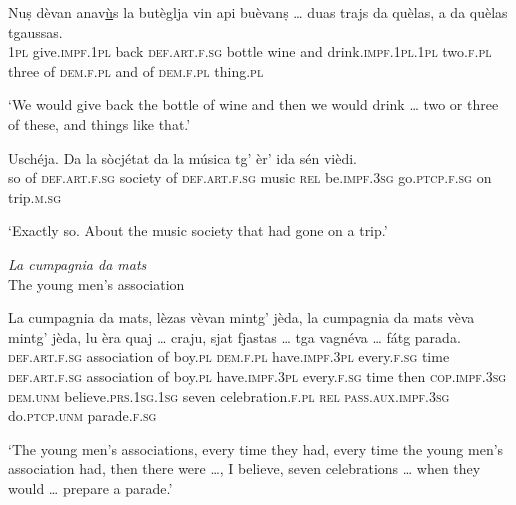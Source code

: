 \begin{linenumbers}
	\gll    Nuṣ dèvan anav\underline{ù}s la butèglja vin api buèvanṣ … duas trajs da quèlas, a da quèlas tgaussas.\\
	\textsc{1pl} give.\textsc{impf.1pl} back \textsc{def.art.f.sg} bottle wine and drink.\textsc{impf.1pl.1pl} {} two.\textsc{f.pl} three of \textsc{dem.f.pl} and of  \textsc{dem.f.pl} thing.\textsc{pl}\\
\end{linenumbers}
\medskip
\glt `We would give back the bottle of wine and then we would drink … two or three of these, and things like that.'
\medskip

\begin{linenumbers}
\gll    Uschéja. Da la sòcjétat da la música tg’ èr’ ida sén vièdi.\\
so of \textsc{def.art.f.sg} society of \textsc{def.art.f.sg} music \textsc{rel} be.\textsc{impf.3sg} go.\textsc{ptcp.f.sg} on trip.\textsc{m.sg}\\
\end{linenumbers}
\medskip
\glt `Exactly so. About the music society that had gone on a trip.'
\bigskip

\textit{La cumpagnia da mats}\\
The young men's association\\
\smallskip

\begin{linenumbers}
\gll    La cumpagnia da mats, lèzas vèvan mintg’ jèda, la cumpagnia da mats vèva mintg’ jèda, lu èra quaj … craju, sjat fjastas … tga vagnéva … fátg parada.\\
\textsc{def.art.f.sg} association of boy.\textsc{pl} \textsc{dem.f.pl} have.\textsc{impf.3pl} every.\textsc{f.sg} time \textsc{def.art.f.sg} association of boy.\textsc{pl} have.\textsc{impf.3pl} every.\textsc{f.sg} time then \textsc{cop.impf.3sg} \textsc{dem.unm} {} believe.\textsc{prs.1sg.1sg} seven celebration.\textsc{f.pl} {} \textsc{rel} \textsc{pass.aux.impf.3sg} {} do.\textsc{ptcp.unm} parade.\textsc{f.sg}\\
\end{linenumbers}
\medskip
\glt `The young men's associations, every time they had, every time the young men's association had, then there were …, I believe, seven celebrations … when they would … prepare a parade.'
\medskip

